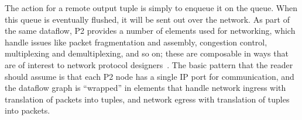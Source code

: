The action for a remote output tuple is simply to enqueue it on the  queue.  When this queue is eventually flushed, it will be sent out over
the network.  As part of the same dataflow, P2 provides a number of elements
used for networking, which handle issues like packet fragmentation and
assembly, congestion control, multiplexing and demultiplexing, and so on; these
are composable in ways that are of interest to network protocol
designers~\cite{condie-hotnets05}.  The basic pattern that the reader should
assume is that each P2 node has a single IP port for communication, and the
dataflow graph is ``wrapped'' in elements that handle network ingress with
translation of packets into tuples, and network egress with translation of
tuples into packets.


